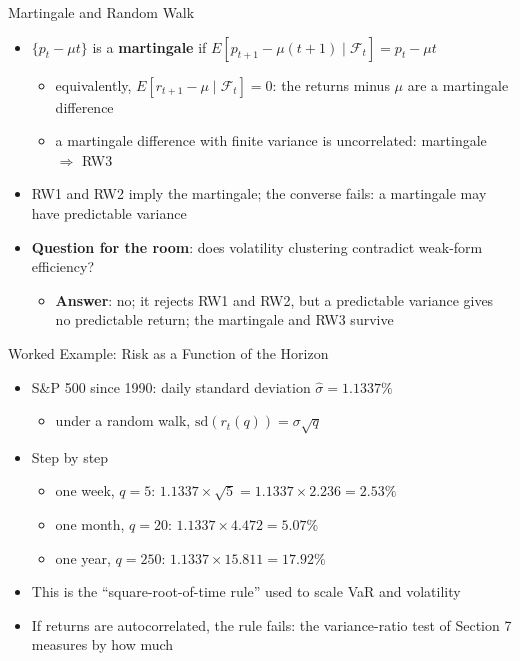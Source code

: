 \begin{frame}{Martingale and Random Walk}
\itemsize{\small}
\begin{itemize}
    \item $\{p_t - \mu t\}$ is a \textbf{martingale} if $E[p_{t+1} - \mu(t+1) \mid \mathcal{F}_t] = p_t - \mu t$ 
    \begin{itemize}
        \item equivalently, $E[r_{t+1} - \mu \mid \mathcal{F}_t] = 0$: the returns minus $\mu$ are a martingale difference
        \item a martingale difference with finite variance is uncorrelated: martingale $\Rightarrow$ RW3
    \end{itemize}
    \item RW1 and RW2 imply the martingale; the converse fails: a martingale may have predictable variance
    \item \textbf{Question for the room}: does volatility clustering contradict weak-form efficiency?
    \begin{itemize}
        \item \textbf{Answer}: no; it rejects RW1 and RW2, but a predictable variance gives no predictable return; the martingale and RW3 survive
    \end{itemize}
\end{itemize}
\end{frame}

\begin{frame}{Worked Example: Risk as a Function of the Horizon}
\itemsize{\small}
\begin{itemize}
    \item S\&P 500 since 1990: daily standard deviation $\hat\sigma = 1.1337\%$
    \begin{itemize}
        \item under a random walk, $\mathrm{sd}(r_t(q)) = \sigma\sqrt{q}$
    \end{itemize}
    \item Step by step
    \begin{itemize}
        \item one week, $q = 5$: $1.1337 \times \sqrt{5} = 1.1337 \times 2.236 = 2.53\%$
        \item one month, $q = 20$: $1.1337 \times 4.472 = 5.07\%$
        \item one year, $q = 250$: $1.1337 \times 15.811 = 17.92\%$
    \end{itemize}
    \item This is the ``square-root-of-time rule'' used to scale VaR and volatility
    \item If returns are autocorrelated, the rule fails: the variance-ratio test of Section 7 measures by how much
\end{itemize}
\end{frame}


